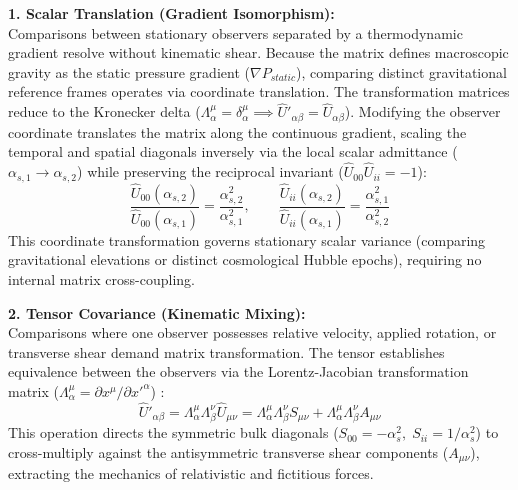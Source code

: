 \textbf{1. Scalar Translation (Gradient Isomorphism):} \\
Comparisons between stationary observers separated by a thermodynamic gradient resolve without kinematic shear. Because the matrix defines macroscopic gravity as the static pressure gradient ($\nabla P_{static}$), comparing distinct gravitational reference frames operates via coordinate translation. The transformation matrices reduce to the Kronecker delta ($\Lambda^\mu_\alpha = \delta^\mu_\alpha \implies \hat{U}'_{\alpha\beta} = \hat{U}_{\alpha\beta}$). Modifying the observer coordinate translates the matrix along the continuous gradient, scaling the temporal and spatial diagonals inversely via the local scalar admittance ($\alpha_{s,1} \to \alpha_{s,2}$) while preserving the reciprocal invariant ($\hat{U}_{00}\hat{U}_{ii} = -1$):
\begin{equation}
    \frac{\hat{U}_{00}(\alpha_{s,2})}{\hat{U}_{00}(\alpha_{s,1})} = \frac{\alpha_{s,2}^2}{\alpha_{s,1}^2}, \qquad \frac{\hat{U}_{ii}(\alpha_{s,2})}{\hat{U}_{ii}(\alpha_{s,1})} = \frac{\alpha_{s,1}^2}{\alpha_{s,2}^2} %
\end{equation}
This coordinate transformation governs stationary scalar variance (comparing gravitational elevations or distinct cosmological Hubble epochs), requiring no internal matrix cross-coupling.

\vspace{0.2 cm}

\textbf{2. Tensor Covariance (Kinematic Mixing):} \\
Comparisons where one observer possesses relative velocity, applied rotation, or transverse shear demand matrix transformation. The tensor establishes equivalence between the observers via the Lorentz-Jacobian transformation matrix ($\Lambda^\mu_\alpha = \partial x^\mu / \partial x'^\alpha$) \cite{Misner1973}:
\begin{equation}
    \hat{U}'_{\alpha\beta} = \Lambda^\mu_\alpha \Lambda^\nu_\beta \hat{U}_{\mu\nu} = \Lambda^\mu_\alpha \Lambda^\nu_\beta S_{\mu\nu} + \Lambda^\mu_\alpha \Lambda^\nu_\beta A_{\mu\nu} \label{eq:tensor_transformation} %
\end{equation}
This operation directs the symmetric bulk diagonals ($S_{00} = -\alpha_s^2, \; S_{ii} = 1/\alpha_s^2$) to cross-multiply against the antisymmetric transverse shear components ($A_{\mu\nu}$), extracting the mechanics of relativistic and fictitious forces.

